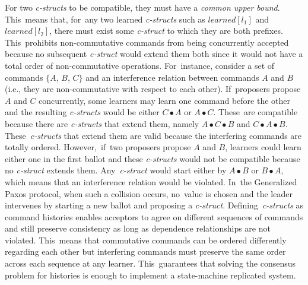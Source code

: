 \documentclass[algorithms,article,accept,moreauthors,pdftex,10pt,a4paper]{Definitions/mdpi}
\begin{document}
For two \textit{c-structs} to be compatible, they must have a \textit{common upper bound}. This~means that, for~any two learned \textit{c-structs} such as $learned[l_1]$ and $learned[l_2]$, there must exist some \textit{c-struct} to which they are both prefixes. This~prohibits non-commutative commands from being concurrently accepted because no subsequent \textit{c-struct} would extend them both since it would not have a total order of non-commutative operations. For~instance, consider a set of commands $\lbrace A$, $B$, $C\rbrace$ and an interference relation between commands $A$ and $B$ (i.e., they are non-commutative with respect to each other). If~proposers propose $A$ and $C$ concurrently, some learners may learn one command before the other and the resulting \textit{c-structs} would be either $C \bullet A$ or $A \bullet C$. These~are compatible because there are \textit{c-structs} that extend them, namely $A \bullet C \bullet B$ and $C \bullet A \bullet B$. These~\textit{c-structs} that extend them are valid because the interfering commands are totally ordered. However,~if~two proposers propose $A$ and $B$, learners could learn either one in the first ballot and these \textit{c-structs} would not be compatible because no \textit{c-struct} extends them. Any~\textit{c-struct} would start either by $A \bullet B$ or $B \bullet A$, which means that an interference relation would be violated. In~the Generalized Paxos protocol, when such a collision occurs, no~value is chosen and the leader intervenes by starting a new ballot and proposing a \textit{c-struct}. Defining~\textit{c-structs} as command histories enables acceptors to agree on different sequences of commands and still preserve consistency as long as dependence relationships are not violated. This~means that commutative commands can be ordered differently regarding each other but interfering commands must preserve the same order across each sequence at any learner. This~guarantees that solving the consensus problem for histories is enough to implement a state-machine replicated system. \par
\end{document}

